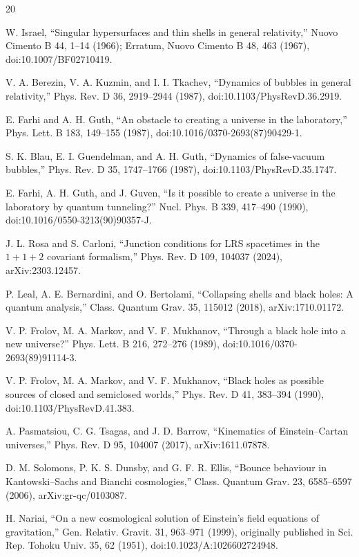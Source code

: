 \documentclass[pdflatex,sn-mathphys-num]{sn-jnl}
\begin{document}
\begin{thebibliography}{20}

 W. Israel, “Singular hypersurfaces and thin shells in general relativity,” Nuovo Cimento B 44, 1--14 (1966); Erratum, Nuovo Cimento B 48, 463 (1967), doi:10.1007/BF02710419.

 V. A. Berezin, V. A. Kuzmin, and I. I. Tkachev, “Dynamics of bubbles in general relativity,” Phys. Rev. D 36, 2919--2944 (1987), doi:10.1103/PhysRevD.36.2919.

 E. Farhi and A. H. Guth, “An obstacle to creating a universe in the laboratory,” Phys. Lett. B 183, 149--155 (1987), doi:10.1016/0370-2693(87)90429-1.

 S. K. Blau, E. I. Guendelman, and A. H. Guth, “Dynamics of false-vacuum bubbles,” Phys. Rev. D 35, 1747--1766 (1987), doi:10.1103/PhysRevD.35.1747.

 E. Farhi, A. H. Guth, and J. Guven, “Is it possible to create a universe in the laboratory by quantum tunneling?” Nucl. Phys. B 339, 417--490 (1990), doi:10.1016/0550-3213(90)90357-J.

 J. L. Rosa and S. Carloni, “Junction conditions for LRS spacetimes in the \(1+1+2\) covariant formalism,” Phys. Rev. D 109, 104037 (2024), arXiv:2303.12457.

 P. Leal, A. E. Bernardini, and O. Bertolami, “Collapsing shells and black holes: A quantum analysis,” Class. Quantum Grav. 35, 115012 (2018), arXiv:1710.01172.

 V. P. Frolov, M. A. Markov, and V. F. Mukhanov, “Through a black hole into a new universe?” Phys. Lett. B 216, 272--276 (1989), doi:10.1016/0370-2693(89)91114-3.

 V. P. Frolov, M. A. Markov, and V. F. Mukhanov, “Black holes as possible sources of closed and semiclosed worlds,” Phys. Rev. D 41, 383--394 (1990), doi:10.1103/PhysRevD.41.383.

 A. Pasmatsiou, C. G. Tsagas, and J. D. Barrow, “Kinematics of Einstein--Cartan universes,” Phys. Rev. D 95, 104007 (2017), arXiv:1611.07878.

 D. M. Solomons, P. K. S. Dunsby, and G. F. R. Ellis, “Bounce behaviour in Kantowski--Sachs and Bianchi cosmologies,” Class. Quantum Grav. 23, 6585--6597 (2006), arXiv:gr-qc/0103087.

 H. Nariai, “On a new cosmological solution of Einstein's field equations of gravitation,” Gen. Relativ. Gravit. 31, 963--971 (1999), originally published in Sci. Rep. Tohoku Univ. 35, 62 (1951), doi:10.1023/A:1026602724948.


\end{thebibliography}
\end{document}
